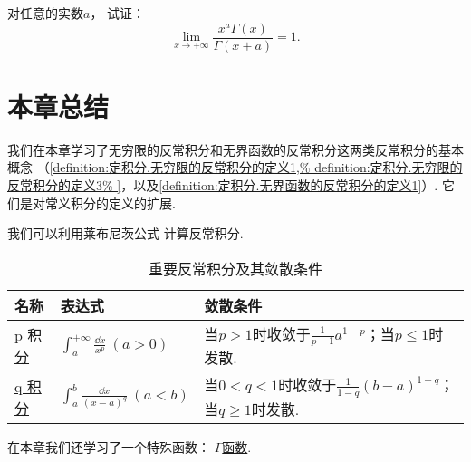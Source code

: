 \begin{corollary}
对任意的实数\(a\)，
试证：\begin{equation}\label{equation:反常积分.伽马函数.极限1}
	\lim_{x\to+\infty} \frac{x^a \Gamma(x)}{\Gamma(x+a)} = 1.
\end{equation}
\end{corollary}

\section{本章总结}

我们在本章学习了无穷限的反常积分和无界函数的反常积分这两类反常积分的基本概念%
（\cref{definition:定积分.无穷限的反常积分的定义1,%
definition:定积分.无穷限的反常积分的定义3%
}，以及\cref{definition:定积分.无界函数的反常积分的定义1}）.
它们是对常义积分的定义的扩展.

我们可以利用莱布尼茨公式
计算反常积分.

\begin{table}[hb]
	\centering
	\begin{tabular}{*3l}
		\hline
		名称 & 表达式 & 敛散条件 \\
		\hline
		{\hyperref[example:定积分.p积分]{p 积分}}
			& \(\int_a^{+\infty} \frac{\dd{x}}{x^p}\ (a>0)\)
			& 当\(p > 1\)时收敛于\(\frac{1}{p-1} a^{1-p}\)；当\(p \leq 1\)时发散. \\[.5cm]
		{\hyperref[example:定积分.q积分]{q 积分}}
			& \(\int_a^b \frac{\dd{x}}{(x-a)^q}\ (a<b)\)
			& 当\(0 < q < 1\)时收敛于\(\frac{1}{1-q} (b-a)^{1-q}\)；当\(q \geq 1\)时发散. \\[.5cm]
		\hline
	\end{tabular}
	\caption{重要反常积分及其敛散条件}
\end{table}

在本章我们还学习了一个特殊函数：
\hyperref[equation:特殊函数.伽马函数的积分定义]{\(\Gamma\)函数}.
